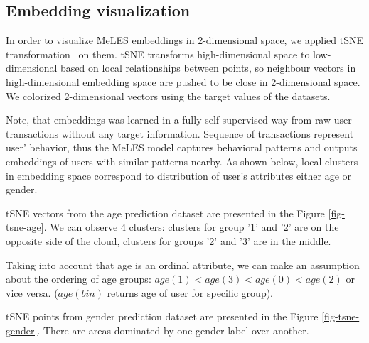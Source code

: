 \documentclass{article}
\begin{document}
\subsection{Embedding visualization}

In order to visualize MeLES embeddings in 2-dimensional space, we applied tSNE transformation~\cite{Maaten2008VisualizingDU} on them. tSNE transforms high-dimensional space to low-dimensional based on local relationships between points, so neighbour vectors in high-dimensional embedding space are pushed to be close in 2-dimensional space. We colorized 2-dimensional vectors using the target values of the datasets.

Note, that embeddings was learned in a fully self-supervised way from raw user transactions without any target information. Sequence of transactions represent user' behavior, thus the MeLES model captures behavioral patterns and outputs embeddings of users with similar patterns nearby.
As shown below, local clusters in embedding space correspond to distribution of user's attributes either age or gender.

tSNE vectors from the age prediction dataset are presented in the Figure \ref{fig-tsne-age}. We can observe 4 clusters: clusters for group '1' and '2' are on the opposite side of the cloud, clusters for groups '2' and '3' are in the middle.

Taking into account that age is an ordinal attribute, we can make an assumption about the ordering of age groups: $age(1) < age(3) < age(0) < age(2)$ or vice versa. ($age(bin)$ returns age of user for specific group).

tSNE points from gender prediction dataset are presented in the Figure \ref{fig-tsne-gender}. There are areas dominated by one gender label over another.
\end{document}
